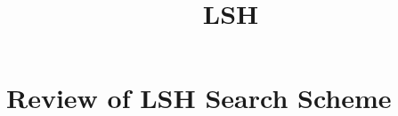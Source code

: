 \documentclass{beamer}
\title{LSH}
\begin{document}
	\maketitle
	\section{Review of LSH Search Scheme}
	
	
	
	\begin{frame}[allowframebreaks]
	
	
	\end{frame}
\end{document}
